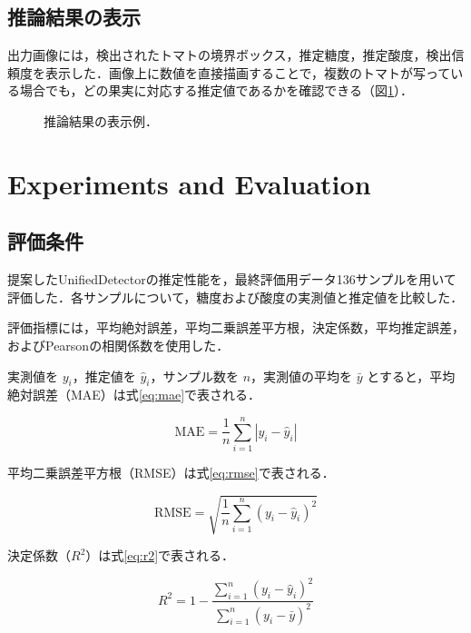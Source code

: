 \documentclass[authorproof,JRM,paper]{fujipressarticle}
\begin{document}
\subsection{推論結果の表示}

出力画像には，検出されたトマトの境界ボックス，推定糖度，推定酸度，検出信頼度を表示した．画像上に数値を直接描画することで，複数のトマトが写っている場合でも，どの果実に対応する推定値であるかを確認できる（図\ref{fig:inference_example}）．

\begin{figure}[t]
\centering
{}
\caption{推論結果の表示例．}
\label{fig:inference_example}
\end{figure}

\section{Experiments and Evaluation}
\subsection{評価条件}
提案したUnifiedDetectorの推定性能を，最終評価用データ136サンプルを用いて評価した．各サンプルについて，糖度および酸度の実測値と推定値を比較した．

評価指標には，平均絶対誤差，平均二乗誤差平方根，決定係数，平均推定誤差，およびPearsonの相関係数を使用した．

実測値を $y_i$，推定値を $\hat{y}_i$，サンプル数を $n$，実測値の平均を $\bar{y}$ とすると，平均絶対誤差（MAE）は式\eqref{eq:mae}で表される．

\begin{equation}
    \text{MAE} = \frac{1}{n}\sum_{i=1}^{n}|y_i-\hat{y}_i|
    \label{eq:mae}
\end{equation}

平均二乗誤差平方根（RMSE）は式\eqref{eq:rmse}で表される．

\begin{equation}
    \text{RMSE} = \sqrt{\frac{1}{n}\sum_{i=1}^{n}(y_i-\hat{y}_i)^2}
    \label{eq:rmse}
\end{equation}

決定係数（$R^2$）は式\eqref{eq:r2}で表される．

\begin{equation}
    R^2 = 1-\frac{\sum_{i=1}^{n}(y_i-\hat{y}_i)^2}{\sum_{i=1}^{n}(y_i-\bar{y})^2}
    \label{eq:r2}
\end{equation}
\end{document}
